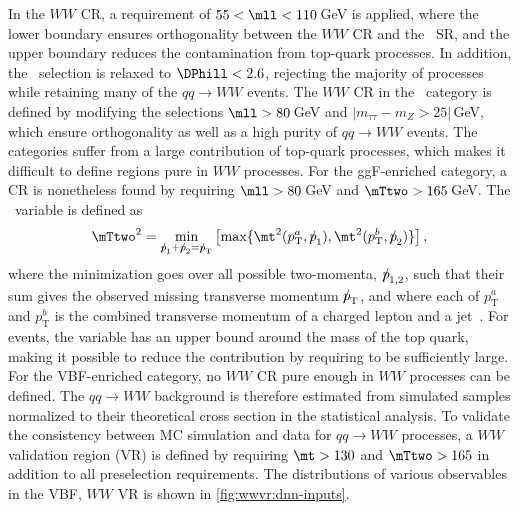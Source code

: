 In the \ZeroJet $WW$ CR, a requirement of $55 < \mll < 110$\,GeV is applied, where the lower boundary ensures orthogonality between the $WW$ CR and the \ZeroJet\ SR, and the upper boundary reduces the contamination from top-quark processes.
In addition, the \DPhill\ selection is relaxed to $\DPhill < 2.6$, rejecting the majority of \Ztautau processes while retaining many of the $qq \to WW$ events.
The $WW$ CR in the \OneJet\ category is defined by modifying the selections $\mll > 80\,$GeV and $|m_{\tau\tau} - m_Z > 25|\,$GeV, which ensure orthogonality as well as a high purity of $qq \to WW$ events.
The \TwoJet categories suffer from a large contribution of top-quark processes, which makes it difficult to define regions pure in $WW$ processes.
For the ggF-enriched \TwoJet category, a CR is nonetheless found by requiring $\mll > 80\,$GeV and $\mTtwo > 165\,$GeV. The \mTtwo\ variable is defined as
\begin{equation}
    \label{eq:mt2-definition}
    \mTtwo^2 = \underset{{p\mkern-9.5mu/}_1+{p\mkern-9.5mu/}_2={p\mkern-9.5mu/}_\text{T}}{\textrm{min}} \left[\textrm{max}\{\mt^2(p_\text{T}^a,{p\mkern-9.5mu/}_1),\mt^2(p_\text{T}^b,{p\mkern-9.5mu/}_2)\}\right],
\end{equation}
where the minimization goes over all possible two-momenta, ${p\mkern-9.5mu/}_{1,2}$, such that their sum gives the observed missing transverse momentum ${p\mkern-9.5mu/}_\text{T}$, and where each of $p_\text{T}^a$ and $p_\text{T}^b$ is the combined transverse momentum of a charged lepton and a jet~\cite{HWWPaper}.
For \ttbar events, the \mTtwo variable has an upper bound around the mass of the top quark, making it possible to reduce the \ttbar contribution by requiring \mTtwo to be sufficiently large.
For the VBF-enriched \TwoJet category, no $WW$ CR pure enough in $WW$ processes can be defined.
The $qq \to WW$ background is therefore estimated from simulated samples normalized to their theoretical cross section in the statistical analysis.
To validate the consistency between MC simulation and data for $qq \to WW$ processes, a $WW$ validation region (VR) is defined by requiring $\mt > 130$ and $\mTtwo > 165$ in addition to all preselection requirements.
The distributions of various observables in the VBF, $WW$ VR is shown in \cref{fig:wwvr:dnn-inputs}.

